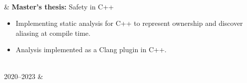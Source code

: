 \documentclass[a4paper]{report}
\begin{document}
\begin{longtabu}
\begin{itemize}[leftmargin=2em, topsep=-.5em, parsep=0em]
    \end{itemize}
    \vspace{-.1em}
    \\
        &  \textbf{Master's thesis:} Safety in C++
        \begin{itemize}[leftmargin=2em, topsep=-.5em, parsep=0em]
            \item Implementing static analysis for C++ to represent ownership and discover aliasing at compile time.
            \item Analysis implemented as a Clang plugin in C++.
        \end{itemize}
    \\
    2020--2023 & 
    \vspace{-1em}
    \begin{itemize}[leftmargin=2em, topsep=-.5em, parsep=0em]
        


\end{itemize}
\end{longtabu}
\end{document}
